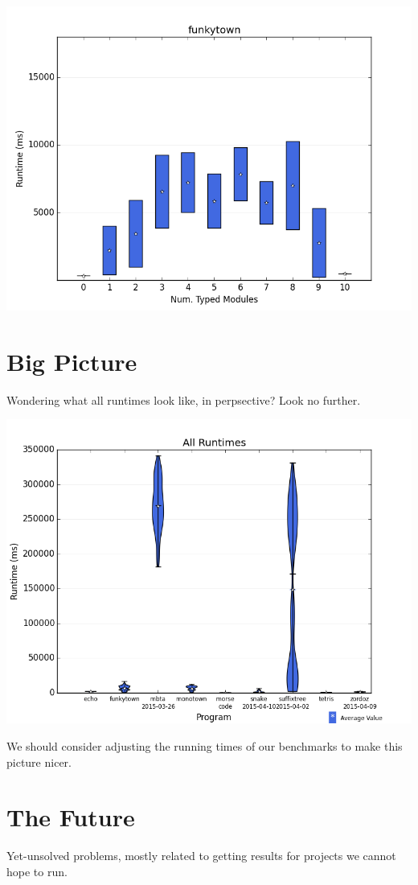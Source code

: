 \documentclass{article}
\begin{document}
\includegraphics[width=\textwidth]{sampling/funkytown-sampling-10.png}

\newpage
\section{Big Picture}
Wondering what all runtimes look like, in perpsective?
Look no further.

\includegraphics[width=\textwidth]{all-runtimes.png}

We should consider adjusting the running times of our benchmarks to make this picture nicer.

\newpage
\section{The Future}
Yet-unsolved problems, mostly related to getting results for projects we cannot hope to run.
\end{document}
